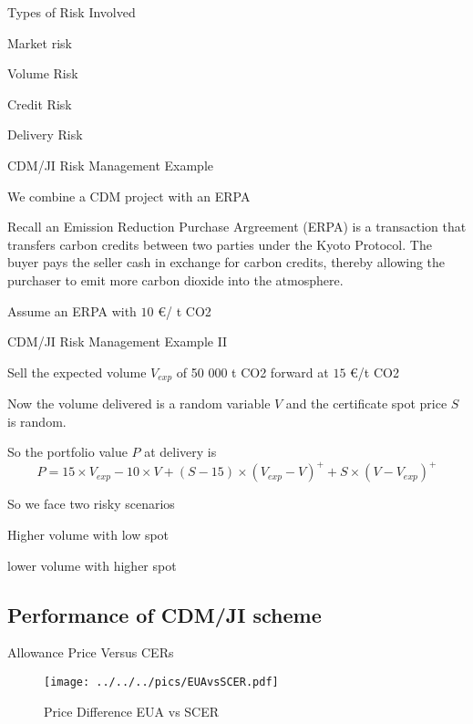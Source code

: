 {Types of Risk Involved}


	Market risk

	Volume Risk

	Credit Risk

	Delivery Risk


{CDM/JI Risk Management Example}


	We combine a CDM project with an ERPA

	Recall an Emission Reduction Purchase Argreement (ERPA) is a  transaction that transfers carbon credits between two parties under the Kyoto Protocol. The buyer pays the seller cash in exchange for carbon credits, thereby allowing the purchaser to emit more carbon dioxide into the atmosphere.

	Assume an ERPA with $10$ \euro/ t CO2


{CDM/JI Risk Management Example II}


	Sell the expected volume $V_{exp}$ of 50 000 t CO2 forward at $15$ \euro /t CO2

	Now the volume delivered is a random variable $V$ and the certificate spot price $S$ is random.

	So the portfolio value $P$ at delivery is
\begin{equation}\nonumber
P = 15 \times V_{exp} - 10 \times V + (S-15) \times (V_{exp}-V)^+ + S \times (V-V_{exp})^+
\end{equation}

	So we face two risky scenarios


	Higher volume with low spot

	lower volume with higher spot



\subsection{Performance of CDM/JI scheme}

{Allowance Price Versus CERs}
\begin{figure}[h!]
\centering
\texttt{[image: ../../../pics/EUAvsSCER.pdf]}
\caption{Price Difference EUA vs SCER}
\label{fig:EUAvsSCER}
\end{figure}

